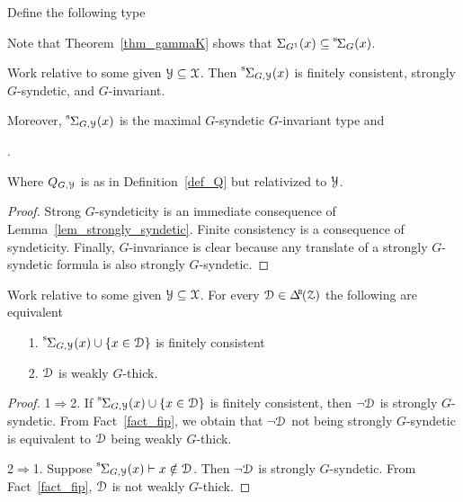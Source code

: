 Define the following type

\smallskip

Note that Theorem~\ref{thm_gammaK} shows that $\Sigma_{G^1}(x)\subseteq{\mathstrut}^{\rm s}\kern-.2ex\Sigma_G(x)$.

\begin{corollary}\label{corol_str_gen}
  Work relative to some given $\EuScript Y\subseteq\EuScript X$.
  Then ${\mathstrut}^{\rm s}\kern-.1ex\Sigma_{G,\EuScript Y}(x)$ is finitely consistent, strongly $G$-syndetic, and $G$-invariant.\smallskip

  Moreover, ${\mathstrut}^{\rm s}\kern-.1ex\Sigma_{G,\EuScript Y}(x)$ is the maximal $G$-syndetic $G$-invariant type and\medskip


  .\smallskip

  Where $Q_{G,\EuScript Y}$ is as in Definition~\ref{def_Q} but relativized to $\EuScript Y$.  
\end{corollary}

\begin{proof}
  Strong $G$-syndeticity is an immediate consequence of Lemma~\ref{lem_strongly_syndetic}.
  Finite consistency is a consequence of syndeticity.
  Finally, $G$-invariance is clear because any translate of a strongly $G$-syndetic formula is also strongly $G$-syndetic.
\end{proof}


\begin{corollary}\label{corol_q_w_pers}
  Work relative to some given $\EuScript Y\subseteq\EuScript X$.
  For every $\D\in\BDelta(\Z)$ the following are equivalent
  \begin{itemize}
    \item [1.] ${\mathstrut}^{\rm s}\kern-.1ex\Sigma_{G,\EuScript Y}(x)\cup\{x\in\EuScript D\}$ is finitely consistent
    \item [2.] $\EuScript D$ is weakly $G$-thick.
  \end{itemize}
\end{corollary}

\begin{proof}
  1$\Rightarrow$2. 
  If ${\mathstrut}^{\rm s}\kern-.1ex\Sigma_{G,\EuScript Y}(x)\cup\{x\in\EuScript D\}$ is finitely consistent, then $\neg\EuScript D$ is strongly $G$-syndetic.
  From Fact~\ref{fact_fip}, we obtain that $\neg\EuScript D$ not being strongly $G$-syndetic is equivalent to $\EuScript D$ being weakly $G$-thick.

  2$\Rightarrow$1.
  Suppose ${\mathstrut}^{\rm s}\kern-.1ex\Sigma_{G,\EuScript Y}(x)\vdash x\notin\EuScript D$.
  Then $\neg\EuScript D$ is strongly $G$-syndetic.
  From Fact~\ref{fact_fip}, $\EuScript D$ is not weakly $G$-thick.
\end{proof}

